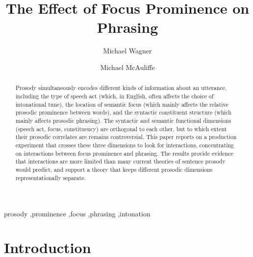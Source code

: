 \documentclass[preprint,review,12pt,authoryear,times]{elsarticle}
\begin{document}
\begin{frontmatter}


\title{The Effect of Focus Prominence on Phrasing}


\author{Michael Wagner}
\author{Michael McAuliffe}



\address{Department of Linguistics, McGill University \\ 1085 Doctor Penfield Avenue, Montr\'eal, Qu\'ebec, H3A 1A7\\Canada}

\begin{abstract}
Prosody simultaneously encodes different kinds of information about an utterance, including the type of speech act (which, in English, often affects the choice of intonational tune), the location of semantic focus (which mainly affects the relative prosodic prominence between words), and the syntactic constituent structure (which mainly affects prosodic phrasing). The syntactic and semantic functional dimensions (speech act, focus, constituency) are orthogonal to each other, but to which extent their prosodic correlates are remains controversial. This paper reports on a production experiment that crosses these three dimensions to look for interactions, concentrating on interactions between focus prominence and phrasing. The results provide evidence that interactions are more limited than many current theories of sentence prosody would predict, and support a theory that keeps different prosodic dimensions representationally separate.
\end{abstract}

\begin{keyword}

prosody \sep prominence \sep focus \sep phrasing \sep intonation

\end{keyword}

\end{frontmatter}


\section{Introduction}
 
\end{document}
